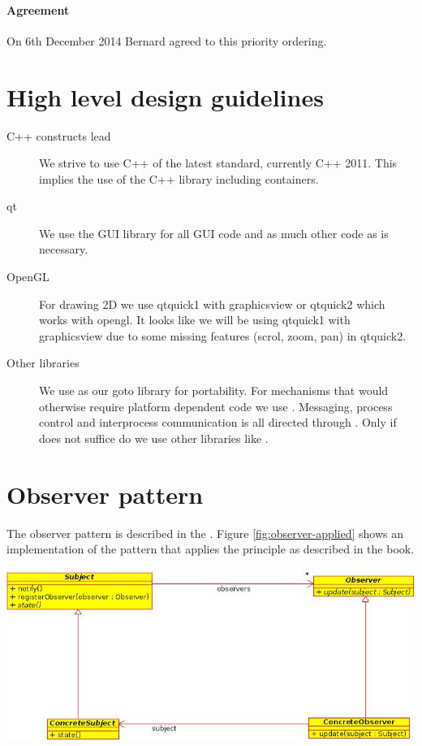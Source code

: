 \paragraph{Agreement} On 6th December 2014 Bernard agreed to this priority ordering. 

\section{High level design guidelines}

\begin{description}

	\item[C++ constructs lead] We strive to use C++ of the latest standard, currently C++ 2011.
	This implies the use of the C++ library including containers.
	
	\item[qt] We use the GUI library \qt for all GUI code and as much other code as is necessary.
	
	\item[OpenGL] For drawing 2D we use qtquick1 with graphicsview or qtquick2 which works with opengl.
	It looks like we will be using qtquick1 with graphicsview due to some missing features (scrol, zoom, 
	pan) in qtquick2.

	\item[Other libraries] We use \qt as our goto library for portability. For mechanisms that would
	otherwise require platform dependent code we use \qt. Messaging, process control and
	interprocess communication is all directed through \qt. Only if \qt does not suffice do we
	use other libraries like \boost.
	
	
\end{description}

\section{Observer pattern}

The observer pattern is described in the  \citep{Gamma:1995:DPE:186897}. 
Figure \ref{fig:observer-applied} shows an implementation of 
the pattern that applies the principle as 
described in the book.

\begin{center}
	\includegraphics[width=.7\linewidth]{ObserverClassDiagram.jpeg}
	\label{fig:observer-pattern}
\end{center}

